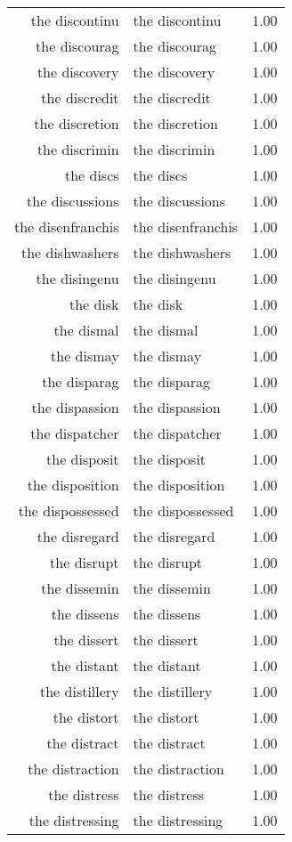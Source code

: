 \begin{table}[ht]
\begin{tabular}{rlr}
  the discontinu & the discontinu & 1.00 \\ 
  the discourag & the discourag & 1.00 \\ 
  the discovery & the discovery & 1.00 \\ 
  the discredit & the discredit & 1.00 \\ 
  the discretion & the discretion & 1.00 \\ 
  the discrimin & the discrimin & 1.00 \\ 
  the discs & the discs & 1.00 \\ 
  the discussions & the discussions & 1.00 \\ 
  the disenfranchis & the disenfranchis & 1.00 \\ 
  the dishwashers & the dishwashers & 1.00 \\ 
  the disingenu & the disingenu & 1.00 \\ 
  the disk & the disk & 1.00 \\ 
  the dismal & the dismal & 1.00 \\ 
  the dismay & the dismay & 1.00 \\ 
  the disparag & the disparag & 1.00 \\ 
  the dispassion & the dispassion & 1.00 \\ 
  the dispatcher & the dispatcher & 1.00 \\ 
  the disposit & the disposit & 1.00 \\ 
  the disposition & the disposition & 1.00 \\ 
  the dispossessed & the dispossessed & 1.00 \\ 
  the disregard & the disregard & 1.00 \\ 
  the disrupt & the disrupt & 1.00 \\ 
  the dissemin & the dissemin & 1.00 \\ 
  the dissens & the dissens & 1.00 \\ 
  the dissert & the dissert & 1.00 \\ 
  the distant & the distant & 1.00 \\ 
  the distillery & the distillery & 1.00 \\ 
  the distort & the distort & 1.00 \\ 
  the distract & the distract & 1.00 \\ 
  the distraction & the distraction & 1.00 \\ 
  the distress & the distress & 1.00 \\ 
  the distressing & the distressing & 1.00 \\ 

\end{tabular}
\end{table}
